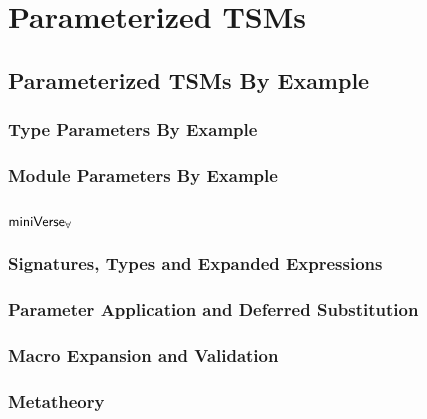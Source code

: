 
\chapter{Parameterized TSMs}\label{chap:ptsms}
\section{Parameterized TSMs By Example}
\subsection{Type Parameters By Example}
\subsection{Module Parameters By Example}
\section{\texorpdfstring{$\mathsf{miniVerse}_\mathbf{\forall}$}{miniVerseForall}}
\subsection{Signatures, Types and Expanded Expressions}
\subsection{Parameter Application and Deferred Substitution}
\subsection{Macro Expansion and Validation}
\subsection{Metatheory}

